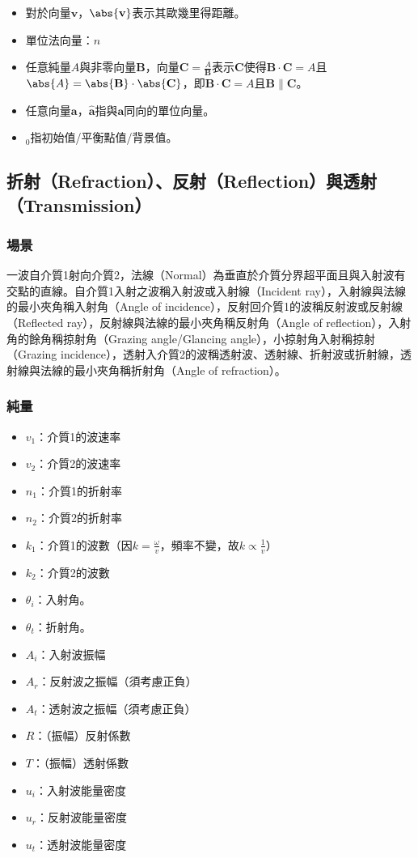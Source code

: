 \documentclass[a4paper,12pt]{report}
\begin{document}
\begin{itemize}
\item 對於向量$\mathbf{v}$，$\abs{\mathbf{v}}$表示其歐幾里得距離。
\item 單位法向量：$\hat{n}$
\item 任意純量$A$與非零向量$\mathbf{B}$，向量$\mathbf{C}=\frac{A}{\mathbf{B}}$表示$\mathbf{C}$使得$\mathbf{B}\cdot \mathbf{C}=A$且$\abs{A}=\abs{\mathbf{B}}\cdot \abs{\mathbf{C}}$，即$\mathbf{B}\cdot \mathbf{C}=A$且$\mathbf{B}\parallel\mathbf{C}$。
\item 任意向量$\mathbf{a}$，$\hat{\mathbf{a}}$指與$\mathbf{a}$同向的單位向量。
\item $_0$指初始值/平衡點值/背景值。
\end{itemize}
\subsection{折射（Refraction）、反射（Reflection）與透射（Transmission）}
\subsubsection{場景}
一波自介質1射向介質2，法線（Normal）為垂直於介質分界超平面且與入射波有交點的直線。自介質1入射之波稱入射波或入射線（Incident ray），入射線與法線的最小夾角稱入射角（Angle of incidence），反射回介質1的波稱反射波或反射線（Reflected ray），反射線與法線的最小夾角稱反射角（Angle of reflection），入射角的餘角稱掠射角（Grazing angle/Glancing angle），小掠射角入射稱掠射（Grazing incidence），透射入介質2的波稱透射波、透射線、折射波或折射線，透射線與法線的最小夾角稱折射角（Angle of refraction）。
\subsubsection{純量}
\begin{itemize}
\item $v_1$：介質1的波速率
\item $v_2$：介質2的波速率
\item $n_1$：介質1的折射率
\item $n_2$：介質2的折射率
\item $k_1$：介質1的波數（因$k=\frac{\omega}{v}$，頻率不變，故$k\propto\frac{1}{v}$）
\item $k_2$：介質2的波數
\item \( \theta_i \)：入射角。
\item \( \theta_t \)：折射角。
\item $A_i$：入射波振幅
\item $A_r$：反射波之振幅（須考慮正負）
\item $A_t$：透射波之振幅（須考慮正負）
\item $R$：（振幅）反射係數
\item $T$：（振幅）透射係數
\item $u_i$：入射波能量密度
\item $u_r$：反射波能量密度
\item $u_t$：透射波能量密度
\end{itemize}
\end{document}
